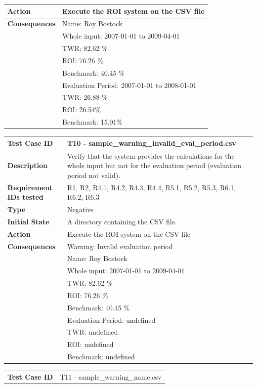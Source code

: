 \documentclass[runningheads,12pt]{article}
\begin{document}
{\begin{tabular}{|p{1.2in}|p{4in}|}
\hline 
\textbf{Action} & Execute the ROI system on the CSV file \\
\hline 
\textbf{Consequences} & Name: Roy Bostock\\
& Whole input: 2007-01-01 to 2009-04-01\\
& TWR:  82.62 $\%$\\
& ROI: 76.26 $\%$\\
& Benchmark: 40.45 $\%$ \\ 
& Evaluation Period: 2007-01-01 to 2008-01-01\\
& TWR: 26.88 $\%$\\
& ROI: 26.54$\%$\\
& Benchmark: 15.01$\%$ \\ 
\hline
\end{tabular}
\bigskip
\centering
\begin{tabular}{|p{1.2in}|p{4in}|}
\hline
\textbf{Test Case ID} & T10 - sample\_warning\_invalid\_eval\_period.csv \\ 
\hline
\textbf{Description} & Verify that the system provides the calculations for the whole input but not for the evaluation period (evaluation period not valid).\\
\hline
\textbf{Requirement IDs tested} & R1, R2, R4.1, R4.2, R4.3, R4.4, R5.1, R5.2, R5.3, R6.1, R6.2, R6.3 \\ 
\hline
\textbf{Type} & Negative \\ 
\hline
\textbf{Initial State} & A directory containing the CSV file.\\
\hline 
\textbf{Action} & Execute the ROI system on the CSV file \\
\hline 
\textbf{Consequences} & Warning: Invalid evaluation period\\
& Name: Roy Bostock\\
& Whole input: 2007-01-01 to 2009-04-01\\
& TWR:  82.62 $\%$\\
& ROI: 76.26 $\%$\\
& Benchmark: 40.45 $\%$ \\ 
& Evaluation Period: undefined\\
& TWR: undefined\\
& ROI: undefined\\
& Benchmark: undefined \\ 
\hline
\end{tabular}
\bigskip
\centering
\begin{tabular}{|p{1.2in}|p{4in}|}
\hline
\textbf{Test Case ID} & T11 - sample\_warning\_name.csv \\ 

\end{tabular}}
\end{document}

